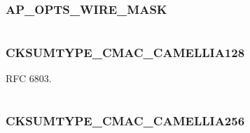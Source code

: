 \documentclass[letterpaper,10pt,english]{sphinxmanual}
\begin{document}
\subsubsection{AP\_OPTS\_WIRE\_MASK}
\label{appdev/refs/macros/AP_OPTS_WIRE_MASK:ap-opts-wire-mask-data}\label{appdev/refs/macros/AP_OPTS_WIRE_MASK:ap-opts-wire-mask}\label{appdev/refs/macros/AP_OPTS_WIRE_MASK::doc}

\begin{fulllineitems}
\label{appdev/refs/macros/AP_OPTS_WIRE_MASK:AP_OPTS_WIRE_MASK}
\end{fulllineitems}


\begin{tabulary}{\linewidth}{|L|L|}
\hline

 & 
\\
\hline\end{tabulary}



\subsubsection{CKSUMTYPE\_CMAC\_CAMELLIA128}
\label{appdev/refs/macros/CKSUMTYPE_CMAC_CAMELLIA128::doc}\label{appdev/refs/macros/CKSUMTYPE_CMAC_CAMELLIA128:cksumtype-cmac-camellia128}\label{appdev/refs/macros/CKSUMTYPE_CMAC_CAMELLIA128:cksumtype-cmac-camellia128-data}

\begin{fulllineitems}
\label{appdev/refs/macros/CKSUMTYPE_CMAC_CAMELLIA128:CKSUMTYPE_CMAC_CAMELLIA128}
\end{fulllineitems}


RFC 6803.

\begin{tabulary}{\linewidth}{|L|L|}
\hline

 & 
\\
\hline\end{tabulary}



\subsubsection{CKSUMTYPE\_CMAC\_CAMELLIA256}
\label{appdev/refs/macros/CKSUMTYPE_CMAC_CAMELLIA256::doc}\label{appdev/refs/macros/CKSUMTYPE_CMAC_CAMELLIA256:cksumtype-cmac-camellia256}\label{appdev/refs/macros/CKSUMTYPE_CMAC_CAMELLIA256:cksumtype-cmac-camellia256-data}
\end{document}
